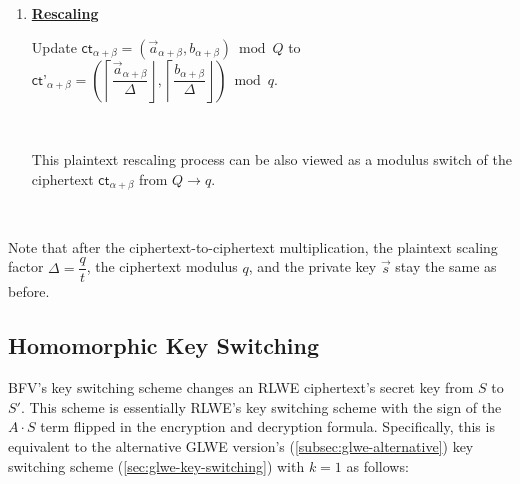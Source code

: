 \begin{tcolorbox}[title={\textbf{\tboxlabel{\ref*{subsubsec:bfv-mult-cipher-summary}} TFHE's Ciphertext-to-Ciphertext Multiplication - Method 2}}]
\begin{enumerate}
Compute the following:

$ \textsf{ct}_\alpha = (d
_1, d_0)$

$ \textsf{ct}_\beta = \bm{\langle} \textsf{Decomp}^{\beta, l}(\vec{d}_2), \text{ } \textsf{Lev}_{\vec{s}, \sigma}^{\beta, l}(\vec{s}^{\otimes}) \bm{\rangle}$.

$ \textsf{ct}_{\alpha + \beta} = \textsf{ct}_{\alpha} + \textsf{ct}_{\beta}$

$ $

Then, the following property holds:

$\textsf{LWE}^{-1}_{\vec{s}, \sigma}\bm(\textsf{LWE}_{\vec{s}, \sigma}(\Delta^2 \cdot m^{\langle 1 \rangle} \cdot m^{\langle 2 \rangle})\bm) \approx \textsf{LWE}^{-1}_{\vec{s}, \sigma}\bm{(}\textsf{ct}_{\alpha + \beta}\bm)$

$ $




\item \textbf{\underline{Rescaling}}

Update $\textsf{ct}_{\alpha + \beta} = (\vec{a}_{\alpha + \beta}, b_{\alpha + \beta}) \bmod Q$ to $\textsf{ct'}_{\alpha + \beta} = \left(\left\lceil\dfrac{\vec{a}_{\alpha + \beta}}{\Delta}\right\rfloor, \left\lceil\dfrac{b_{\alpha + \beta}}{\Delta}\right\rfloor\right) \bmod q$. 

$ $

This plaintext rescaling process can be also viewed as a modulus switch of the ciphertext $\textsf{ct}_{\alpha + \beta}$ from $Q \rightarrow q$. 


$ $

\end{enumerate}

Note that after the ciphertext-to-ciphertext multiplication, the plaintext scaling factor $\Delta=\dfrac{q}{t}$, the ciphertext modulus $q$, and the private key $\vec{s}$ stay the same as before.



\end{tcolorbox}



\subsection{Homomorphic Key Switching}
\label{subsec:bfv-key-switching}

BFV's key switching scheme changes an RLWE ciphertext's secret key from $S$ to $S'$. This scheme is essentially RLWE's key switching scheme with the sign of the $A\cdot S$ term flipped in the encryption and decryption formula. Specifically, this is equivalent to the alternative GLWE version's (\autoref{subsec:glwe-alternative}) key switching scheme (\autoref{sec:glwe-key-switching}) with $k = 1$ as follows:

